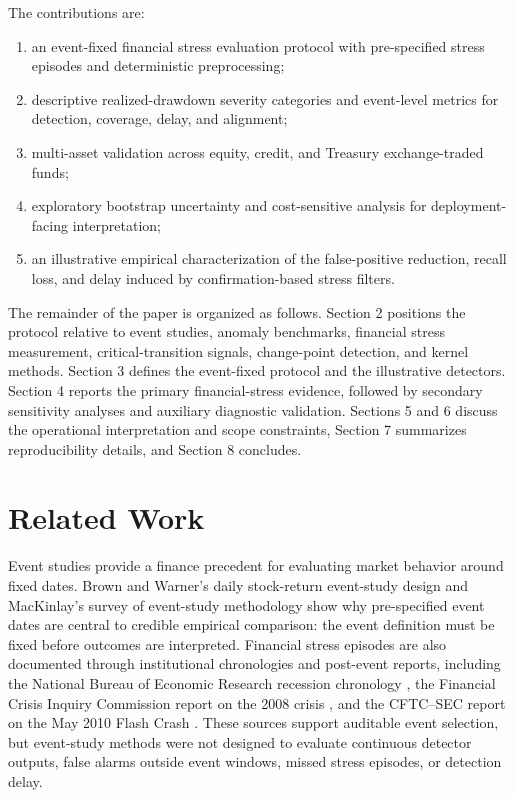 \documentclass[10pt,twocolumn]{article}
\begin{document}
The contributions are:
\begin{enumerate}
\item an event-fixed financial stress evaluation protocol with pre-specified stress episodes and deterministic preprocessing;
\item descriptive realized-drawdown severity categories and event-level metrics for detection, coverage, delay, and alignment;
\item multi-asset validation across equity, credit, and Treasury exchange-traded funds;
\item exploratory bootstrap uncertainty and cost-sensitive analysis for deployment-facing interpretation;
\item an illustrative empirical characterization of the false-positive reduction, recall loss, and delay induced by confirmation-based stress filters.
\end{enumerate}

The remainder of the paper is organized as follows. Section 2 positions the protocol relative to event studies, anomaly benchmarks, financial stress measurement, critical-transition signals, change-point detection, and kernel methods. Section 3 defines the event-fixed protocol and the illustrative detectors. Section 4 reports the primary financial-stress evidence, followed by secondary sensitivity analyses and auxiliary diagnostic validation. Sections 5 and 6 discuss the operational interpretation and scope constraints, Section 7 summarizes reproducibility details, and Section 8 concludes.

\section{Related Work}
Event studies provide a finance precedent for evaluating market behavior around fixed dates. Brown and Warner's daily stock-return event-study design \cite{brown1985} and MacKinlay's survey of event-study methodology \cite{mackinlay1997} show why pre-specified event dates are central to credible empirical comparison: the event definition must be fixed before outcomes are interpreted. Financial stress episodes are also documented through institutional chronologies and post-event reports, including the National Bureau of Economic Research recession chronology \cite{nber2023}, the Financial Crisis Inquiry Commission report on the 2008 crisis \cite{fcic2011}, and the CFTC--SEC report on the May 2010 Flash Crash \cite{cftcsec2010}. These sources support auditable event selection, but event-study methods were not designed to evaluate continuous detector outputs, false alarms outside event windows, missed stress episodes, or detection delay.
\end{document}
